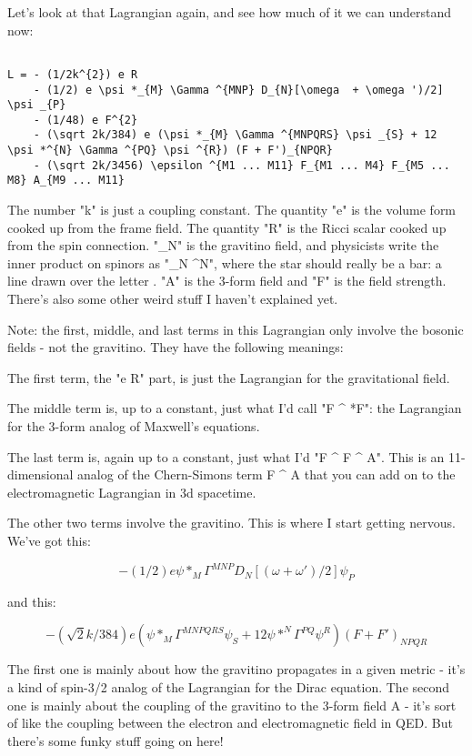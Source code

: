 Let's look at that Lagrangian again, and see how much of it we can 
understand now: 

\begin{verbatim}

L = - (1/2k^{2}) e R  
    - (1/2) e \psi *_{M} \Gamma ^{MNP} D_{N}[\omega  + \omega ')/2] \psi _{P} 
    - (1/48) e F^{2}
    - (\sqrt 2k/384) e (\psi *_{M} \Gamma ^{MNPQRS} \psi _{S} + 12 \psi *^{N} \Gamma ^{PQ} \psi ^{R}) (F + F')_{NPQR} 
    - (\sqrt 2k/3456) \epsilon ^{M1 ... M11} F_{M1 ... M4} F_{M5 ... M8} A_{M9 ... M11}
\end{verbatim}
    

The number "k" is just a coupling constant.  The quantity
"e" is the volume form cooked up from the frame field.  The
quantity "R" is the Ricci scalar cooked up from the spin
connection.  "\psi _{N}" is the gravitino field, and
physicists write the inner product on spinors as
"\psi *_{N} \psi ^{N}", where the
star should really be a bar: a line drawn over the letter \psi .
"A" is the 3-form field and "F" is the field
strength.  There's also some other weird stuff I haven't explained yet.
 
Note: the first, middle, and last terms in this Lagrangian only involve 
the bosonic fields - not the gravitino.   They have the following meanings: 
 
The first term, the "e R" part, is just the Lagrangian for the 
gravitational field. 
 
The middle term is, up to a constant, just what I'd call "F ^
*F": the Lagrangian for the 3-form analog of Maxwell's equations.
 
The last term is, again up to a constant, just what I'd "F ^ F ^
A".  This is an 11-dimensional analog of the Chern-Simons term F ^
A that you can add on to the electromagnetic Lagrangian in 3d spacetime.
 
The other two terms involve the gravitino.  This is where I start getting 
nervous.  We've got this: 
 

$$

    - (1/2) e \psi *_{M} \Gamma ^{MNP} D_{N}[(\omega  + \omega ')/2] \psi _{P}
 
$$
    
and this: 
 

$$

     - (\sqrt 2k/384) e (\psi *_{M} \Gamma ^{MNPQRS} \psi _{S} + 12 \psi *^{N} \Gamma ^{PQ} \psi ^{R}) (F + F')_{NPQR} 
$$
    
The first one is mainly about how the gravitino propagates in a given 
metric - it's a kind of spin-3/2 analog of the Lagrangian for the Dirac 
equation.  The second one is mainly about the coupling of the gravitino 
to the 3-form field A - it's sort of like the coupling between the electron 
and electromagnetic field in QED.  But there's some funky stuff going on 
here!   
 

